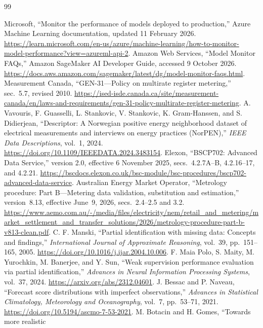 \documentclass[12pt]{article}
\begin{document}
\FloatBarrier
\begin{thebibliography}{99}

 Microsoft, ``Monitor the performance of models deployed
to production,'' Azure Machine Learning documentation, updated 11 February
2026. \url{https://learn.microsoft.com/en-us/azure/machine-learning/how-to-monitor-model-performance?view=azureml-api-2}.
 Amazon Web Services, ``Model Monitor FAQs,'' Amazon
SageMaker AI Developer Guide, accessed 9 October 2026.
\url{https://docs.aws.amazon.com/sagemaker/latest/dg/model-monitor-faqs.html}.
 Measurement Canada, ``GEN-31---Policy on multirate register
metering,'' sec.~5.7, revised 2010.
\url{https://ised-isde.canada.ca/site/measurement-canada/en/laws-and-requirements/gen-31-policy-multirate-register-metering}.
 A. Vavouris, F. Guasselli, L. Stankovic, V. Stankovic,
K. Gram-Hanssen, and S. Didierjean, ``Descriptor: A Norwegian positive
energy neighborhood dataset of electrical measurements and interviews on
energy practices (NorPEN),'' \emph{IEEE Data Descriptions}, vol.~1, 2024.
\url{https://doi.org/10.1109/IEEEDATA.2024.3483154}.
 Elexon, ``BSCP702: Advanced Data Service,'' version 2.0,
effective 6 November 2025, secs.~4.2.7A--B, 4.2.16--17, and 4.2.21.
\url{https://bscdocs.elexon.co.uk/bsc-module/bsc-procedures/bscp702-advanced-data-service}.
 Australian Energy Market Operator,
``Metrology procedure: Part B---Metering data validation, substitution
and estimation,'' version~8.13, effective June~9, 2026,
secs.~2.4--2.5 and 3.2.
\url{https://www.aemo.com.au/-/media/files/electricity/nem/retail_and_metering/market_settlement_and_transfer_solutions/2026/metrology-procedure-part-b-v813-clean.pdf}.
 C. F. Manski, ``Partial identification with missing data:
Concepts and findings,'' \emph{International Journal of Approximate
Reasoning}, vol.~39, pp.~151--165, 2005.
\url{https://doi.org/10.1016/j.ijar.2004.10.006}.
 F. Maia Polo, S. Maity, M. Yurochkin, M. Banerjee, and
Y. Sun, ``Weak supervision performance evaluation via partial
identification,'' \emph{Advances in Neural Information Processing
Systems}, vol.~37, 2024. \url{https://arxiv.org/abs/2312.04601}.
 J. Bessac and P. Naveau, ``Forecast score distributions
with imperfect observations,'' \emph{Advances in Statistical Climatology,
Meteorology and Oceanography}, vol.~7, pp.~53--71, 2021.
\url{https://doi.org/10.5194/ascmo-7-53-2021}.
 M. Botacin and H. Gomes, ``Towards more realistic

\end{thebibliography}
\end{document}
